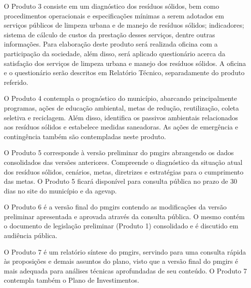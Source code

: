 O Produto 3 consiste em um diagnóstico dos resíduos sólidos, bem como procedimentos operacionais e especificações mínimas a serem adotados em serviços públicos de limpeza urbana e de manejo de resíduos sólidos; indicadores; sistema de cálculo de custos da prestação desses serviços, dentre outras informações. Para elaboração deste produto será realizada oficina com a participação da sociedade, além disso, será aplicado questionário acerca da satisfação dos serviços de limpeza urbana e manejo dos resíduos sólidos. A oficina e o questionário serão descritos em Relatório Técnico, separadamente do produto referido.\vspace{1.5em}

O Produto 4 contempla o prognóstico do município, abarcando principalmente programas, ações de educação ambiental, metas de redução, reutilização, coleta seletiva e reciclagem. Além disso, identifica os passivos ambientais relacionados aos resíduos sólidos e estabelece medidas saneadoras. As ações de emergência e contingência também são contempladas neste produto.\vspace{1.5em}

O Produto 5 corresponde à versão preliminar do \gls{pmgirs} abrangendo os dados consolidados das versões anteriores. Compreende o diagnóstico da situação atual dos resíduos sólidos, cenários, metas, diretrizes e estratégias para o cumprimento das metas. O Produto 5 ficará disponível para consulta pública no prazo de 30 dias no site do município e da \gls{agevap}.\vspace{1.5em}

O Produto 6 é a versão final do \gls{pmgirs} contendo as modificações da versão preliminar apresentada e aprovada através da consulta pública. O mesmo contém o documento de legislação preliminar (Produto 1) consolidado e é discutido em audiência pública.\vspace{1.5em}

O Produto 7 é um relatório síntese do \gls{pmgirs}, servindo para uma consulta rápida às proposições e demais assuntos do plano, visto que a versão final do \gls{pmgirs} é mais adequada para análises técnicas aprofundadas de seu conteúdo. O Produto 7 contempla também o Plano de Investimentos.
